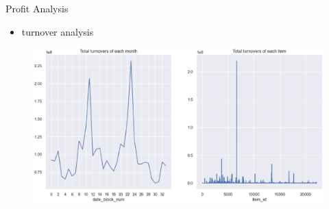 \documentclass[
 size=14pt,
 paper=smartboard,  %
 mode=present, 		%
 display=slides, 	%
 style=tuliplab,  	%
 pauseslide,
 fleqn,leqno]{powerdot}
\begin{document}
\begin{slide}{Profit  Analysis}
  \begin{itemize}
    \item  turnover analysis
  \end{itemize}
  
  \begin{figure}[htbp]
    \centering
    \begin{minipage}[t]{0.28\textwidth}
      \centering
      \centerline{\includegraphics[width=3\textwidth]{logos/turnover.eps}}
      \vspace{-1.0em}
    \end{minipage}
  \end{figure}
\end{slide}
\end{document}
